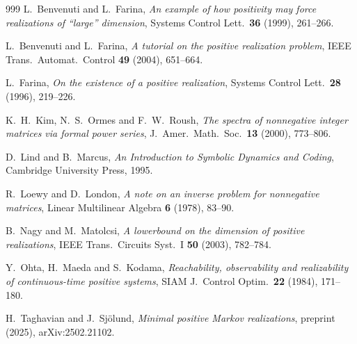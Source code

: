 \begin{thebibliography}{999}
 L.~Benvenuti and L.~Farina, \emph{An example of how positivity may force realizations of ``large'' dimension}, Systems Control Lett.\ \textbf{36} (1999), 261--266.

 L.~Benvenuti and L.~Farina, \emph{A tutorial on the positive realization problem}, IEEE Trans.\ Automat.\ Control \textbf{49} (2004), 651--664.

 L.~Farina, \emph{On the existence of a positive realization}, Systems Control Lett.\ \textbf{28} (1996), 219--226.

 K.~H.~Kim, N.~S.~Ormes and F.~W.~Roush, \emph{The spectra of nonnegative integer matrices via formal power series}, J.\ Amer.\ Math.\ Soc.\ \textbf{13} (2000), 773--806.

 D.~Lind and B.~Marcus, \emph{An Introduction to Symbolic Dynamics and Coding}, Cambridge University Press, 1995.

 R.~Loewy and D.~London, \emph{A note on an inverse problem for nonnegative matrices}, Linear Multilinear Algebra \textbf{6} (1978), 83--90.

 B.~Nagy and M.~Matolcsi, \emph{A lowerbound on the dimension of positive realizations}, IEEE Trans.\ Circuits Syst.\ I \textbf{50} (2003), 782--784.

 Y.~Ohta, H.~Maeda and S.~Kodama, \emph{Reachability, observability and realizability of continuous-time positive systems}, SIAM J.\ Control Optim.\ \textbf{22} (1984), 171--180.

 H.~Taghavian and J.~Sj\"olund, \emph{Minimal positive Markov realizations}, preprint (2025), arXiv:2502.21102.

\end{thebibliography}
